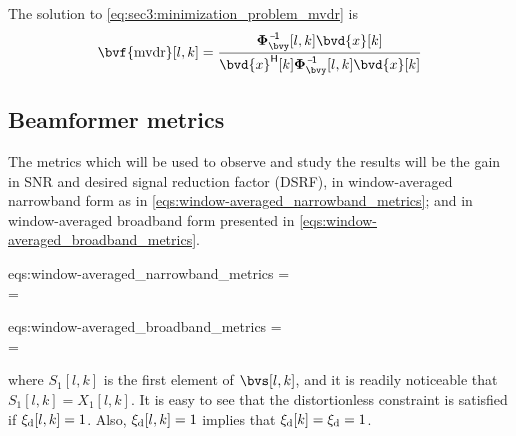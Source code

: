 The solution to \cref{eq:sec3:minimization_problem_mvdr} is
\begin{equation}
	\label{eq:sec3:solution_mvdr_beamformer}
	\bvf{\mvdr}[l,k] = \frac{ \inv{\Corr{\bvy}}[l,k] \bvd{x}[k] }{ \he{\bvd{x}}[k] \inv{\Corr{\bvy}}[l,k] \bvd{x}[k] }
\end{equation}

\subsection{Beamformer metrics}

The metrics which will be used to observe and study the results will be the gain in SNR and desired signal reduction factor (DSRF), in window-averaged narrowband form as in \cref{eqs:window-averaged_narrowband_metrics}; and in window-averaged broadband form presented in \cref{eqs:window-averaged_broadband_metrics}.
%
\begin{subgather}{eqs:window-averaged_narrowband_metrics}
	\gsnr[k] =  \div {} \\
	\dsrf[k] = 
\end{subgather}
\begin{subgather}{eqs:window-averaged_broadband_metrics}
	\gsnr =  \div {} \\
	\dsrf = 
\end{subgather}
where $S_1[l,k]$ is the first element of $\bvs[l,k]$, and it is readily noticeable that $S_1[l,k] = X_1[l,k]$. It is easy to see that the distortionless constraint is satisfied if $\xi_{\mathrm{d}}[l,k] = 1$. Also, $\xi_{\mathrm{d}}[l,k] = 1$ implies that $\xi_{\mathrm{d}}[k] = \xi_{\mathrm{d}} = 1$.